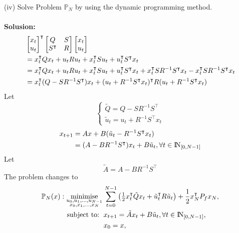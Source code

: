 \documentclass[a4paper,11pt,reqno]{amsart}
\newcommand{\N}{{\rm I\!N}}
\newcommand{\tran}{\intercal}
\DeclareMathOperator*{\minimise}{minimise}
\begin{document}
(iv) Solve Problem $\mathbb{P}_N$ by using the dynamic programming method.
\\ \\
\textbf{Solusion:}
\begin{align}
    &
    \begin{bmatrix}
        x_t\\
        u_t
    \end{bmatrix}^{\tran}
    \begin{bmatrix}
        Q&S\\
        S^{\tran}&R
    \end{bmatrix}
    \begin{bmatrix}
        x_t\\
        u_t
    \end{bmatrix}\notag\\
    &=x_t^{\tran}Qx_t+u_tRu_t+x_t^{\tran}Su_t+u_t^{\tran}S^{\tran}x_t\notag\\
    &=x_t^{\tran}Qx_t+u_tRu_t+x_t^{\tran}Su_t+u_t^{\tran}S^{\tran}x_t+x_t^{\tran}SR^{-1}S^{\tran}x_t-x_t^{\tran}SR^{-1}S^{\tran}x_t\notag\\
    &=x_t^{\tran}(Q-SR^{-1}S^{\tran})x_t+(u_t+R^{-1}S^{\tran}x_t)^{\tran}R(u_t+R^{-1}S^{\tran}x_t)
    \label{eq:P_N_matrix_rewrite}
\end{align}
Let
\begin{equation}
    \begin{cases}
        \tilde{Q}=Q-SR^{-1}S^{\tran}\\
        \tilde{u}_t=u_t+R^{-1}S^{\tran}x_t
    \end{cases}
    \label{eq:tilde_Q_u}
\end{equation}
\begin{align}
    x_{t+1}&=Ax+B(\tilde{u}_t-R^{-1}S^{\tran}x_t)\notag\\
    &=(A-BR^{-1}S^{\tran})x_t+B\tilde{u}_t, \forall t\in\N_{[0, N-1]}
    \label{eq:tilde_x}
\end{align}
Let
\begin{equation}
    \tilde{A}=A-BR^{-1}S^{\tran}
    \label{eq:tilde_A}
\end{equation}
The problem changes to 
\begin{subequations}
    \begin{align}
        \mathbb{P}_N(x): \minimise_{\substack{u_0,u_1,\ldots,u_{N-1}\\ x_0,x_1,\ldots,x_N}} \,
         & \sum_{t=0}^{N-1}\left(\textstyle\frac{1}{2}
         x_t^{\tran}\tilde{Q}x_t+\tilde{u}_t^{\tran}R\tilde{u}_t\right) 
         +\frac{1}{2}x_N^{\tran}P_fx_N,
        \\
        \text{subject to: }\,
         & x_{t+1} = \tilde{A}x_t+B\tilde{u}_t, \forall t\in\N_{[0, N-1]},
        \\
         & x_{0} = x,
    \end{align}
\end{subequations}
\end{document}
